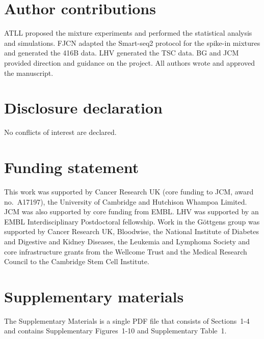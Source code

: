 \documentclass{article}
\newcommand{\suppfigindex}{10}
\newcommand{\suppsecsim}{4}
\begin{document}
\section*{Author contributions}
ATLL proposed the mixture experiments and performed the statistical analysis and simulations.
FJCN adapted the Smart-seq2 protocol for the spike-in mixtures and generated the 416B data.
LHV generated the TSC data.
BG and JCM provided direction and guidance on the project.
All authors wrote and approved the manuscript.

\section*{Disclosure declaration}
No conflicts of interest are declared.

\section*{Funding statement}
This work was supported by Cancer Research UK (core funding to JCM, award no.\ A17197), the University of Cambridge and Hutchison Whampoa Limited.
JCM was also supported by core funding from EMBL.
LHV was supported by an EMBL Interdisciplinary Postdoctoral fellowship.
Work in the G\"ottgens group was supported by Cancer Research UK, Bloodwise, the National Institute of Diabetes and Digestive and Kidney Diseases, the Leukemia and Lymphoma Society and core infrastructure grants from the Wellcome Trust and the Medical Research Council to the Cambridge Stem Cell Institute.

\section*{Supplementary materials}
The Supplementary Materials is a single PDF file that consists of Sections~1-\suppsecsim{} and contains Supplementary Figures~1-\suppfigindex{} and Supplementary Table~1.

{\small


}
\end{document}
